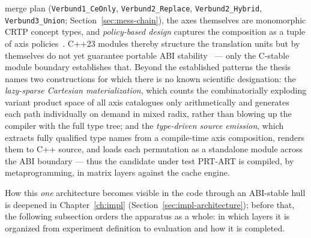 \begin{nurlang}
merge plan (\texttt{Verbund1\_CeOnly}, \texttt{Verbund2\_Replace}, \texttt{Verbund2\_Hybrid},
\texttt{Verbund3\_Union}; Section~\ref{sec:mess-chain}), the axes themselves are monomorphic
CRTP concept types, and \emph{policy-based design} captures the composition as a tuple of
axis policies~\cite{alexandrescu2001modern}. C++23 modules thereby structure the
translation units but by themselves do not yet guarantee portable
ABI stability~\cite{wg21_modules_abi} --- only the C-stable module boundary establishes that. Beyond the established patterns the thesis names two
constructions for which there is no known scientific designation: the \emph{lazy-sparse
Cartesian materialization}, which counts the combinatorially exploding variant product space of all
axis catalogues only
arithmetically and generates each path individually on demand in mixed radix, rather than blowing up the compiler with the full
type tree; and the \emph{type-driven source emission}, which extracts fully qualified type names from a compile-time
axis composition, renders them to C++ source, and loads each permutation as a
standalone module across the ABI boundary --- thus the candidate under test PRT-ART is compiled, by metaprogramming, in
matrix layers against the cache engine.

How this \emph{one} architecture becomes visible in the code through an ABI-stable hull is deepened in
Chapter~\ref{ch:impl} (Section~\ref{sec:impl-architecture}); before that, the following subsection orders the
apparatus as a whole: in which layers it is organized from experiment definition to evaluation
and how it is completed.
\end{nurlang}
